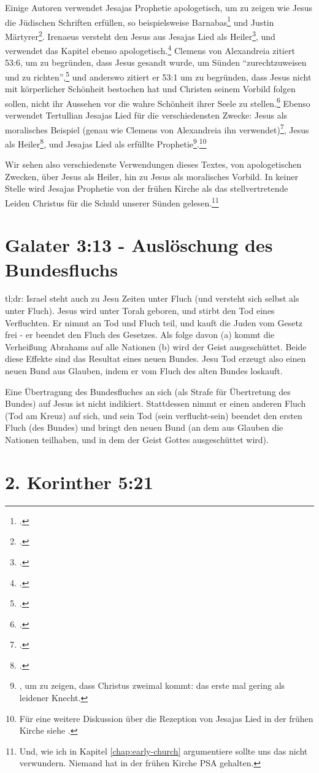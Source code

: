 Einige Autoren verwendet Jesajas Prophetie apologetisch, um zu zeigen wie Jesus die Jüdischen Schriften erfüllen, so beispielsweise Barnabas\Footcite[5:1-7]{epistula-barnabae} und Justin Märtyrer\Footcite[50]{apologia-prima}.
Irenaeus versteht den Jesus aus Jesajas Lied als Heiler\Footcite[IV.33.11]{adversus-haereses}, und verwendet das Kapitel ebenso apologetisch.\Footcite[III.12.9]{adversus-haereses}
Clemens von Alexandreia zitiert 53:6, um zu begründen, dass Jesus gesandt wurde, um Sünden ``zurechtzuweisen und zu richten'',\Footcite[I.8.57:3]{paidagogos} und anderswo
zitiert er 53:1 um zu begründen, dass Jesus nicht mit körperlicher Schönheit bestochen hat und Christen seinem Vorbild folgen sollen, nicht ihr Aussehen vor die wahre Schönheit ihrer Seele zu stellen.\Footcite[III.1.3:3]{paidagogos}
Ebenso verwendet Tertullian Jesajas Lied für die verschiedensten Zwecke:
Jesus als moralisches Beispiel (genau wie Clemens von Alexandreia ihn verwendet)\Footcite[18.3]{de-idolatria},
Jesus als Heiler\Footcite[Kap X; p.166f]{adversus-iudaeos},
und Jesajas Lied als erfüllte Prophetie\footnote{\Cite[20]{de-resurectione-carnis}, \Cite[III.7]{adversus-marcionem} um zu zeigen, dass Christus zweimal kommt: das erste mal gering als leidener Knecht.}.\footnote{
	Für eine weitere Diskussion über die Rezeption von Jesajas Lied in der frühen Kirche siehe \Cite{isa-53-in-anf}.
}

Wir sehen also verschiedenste Verwendungen dieses Textes, von apologetischen Zwecken, über Jesus als Heiler, hin zu Jesus als moralisches Vorbild.
In keiner Stelle wird Jesajas Prophetie von der frühen Kirche als das stellvertretende Leiden Christus für die Schuld unserer Sünden gelesen.\footnote{
	Und, wie ich in Kapitel \ref{chap:early-church} argumentiere sollte uns das nicht verwundern. Niemand hat in der frühen Kirche PSA gehalten.
}


\section{Galater 3:13 - Auslöschung des Bundesfluchs}
tl;dr:
Israel steht auch zu Jesu Zeiten unter Fluch (und versteht sich selbst als unter Fluch).
Jesus wird unter Torah geboren, und stirbt den Tod eines Verfluchten.
Er nimmt an Tod und Fluch teil, und kauft die Juden vom Gesetz frei - er beendet den Fluch des Gesetzes.
Als folge davon (a) kommt die Verheißung Abrahams auf alle Nationen (b) wird der Geist ausgeschüttet.
Beide diese Effekte sind das Resultat eines neuen Bundes.
Jesu Tod erzeugt also einen neuen Bund aus Glauben, indem er vom Fluch des alten Bundes loskauft.

Eine Übertragung des Bundesfluches an sich (als Strafe für Übertretung des Bundes) auf Jesus ist nicht indikiert.
Stattdessen nimmt er einen anderen Fluch (Tod am Kreuz) auf sich, und sein Tod (sein verflucht-sein) beendet den ersten Fluch (des Bundes) und bringt den neuen Bund (an dem aus Glauben die Nationen teilhaben, und in dem der Geist Gottes ausgeschüttet wird).

\section{2. Korinther 5:21}

